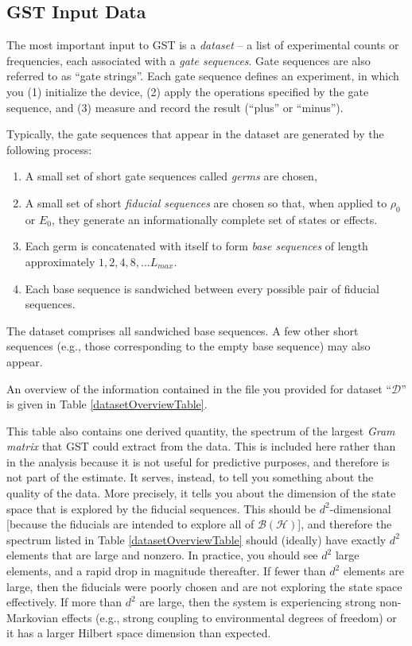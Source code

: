 \documentclass{article}[11pt]
\begin{document}
\subsection{GST Input Data}

The most important input to GST is a \emph{dataset} -- a list of experimental counts or frequencies, each associated with a \emph{gate sequences}.  Gate sequences are also referred to as ``gate strings''.  Each gate sequence defines an experiment, in which you (1) initialize the device, (2) apply the operations specified by the gate sequence, and (3) measure and record the result (``plus'' or ``minus'').

Typically, the gate sequences that appear in the dataset are generated by the following process:
\begin{enumerate}
\item A small set of short gate sequences called \emph{germs} are chosen,
\item A small set of short \emph{fiducial sequences} are chosen so that, when applied to $\rho_0$ or $E_0$, they generate an informationally complete set of states or effects.
\item Each germ is concatenated with itself to form \emph{base sequences} of length approximately $1,2,4,8,\ldots L_{max}$.
\item Each base sequence is sandwiched between every possible pair of fiducial sequences.
\end{enumerate}
The dataset comprises all sandwiched base sequences.  A few other short sequences (e.g., those corresponding to the empty base sequence) may also appear.

\iftoggle{LsAndGermsSet}{ The fiducial sequences and germs for \emph{this} dataset are given in Table \ref{fiducialAndGermListTables}. }{ Fiducial sequence and germ information was not given for this report, and may not be applicable.}  An overview of the information contained in the file you provided for dataset ``$\mathcal{D}$'' is given in Table \ref{datasetOverviewTable}.  

This table also contains one derived quantity, the spectrum of the largest \emph{Gram matrix} that GST could extract from the data.  This is included here rather than in the analysis because it is not useful for predictive purposes, and therefore is not part of the estimate.  It serves, instead, to tell you something about the quality of the data.  More precisely, it tells you about the dimension of the state space that is explored by the fiducial sequences.  This should be $d^2$-dimensional [because the fiducials are intended to explore all of $\mathcal{B}(\mathcal{H})$], and therefore the spectrum listed in Table \ref{datasetOverviewTable} should (ideally) have exactly $d^2$ elements that are large and nonzero.  In practice, you should see $d^2$ large elements, and a rapid drop in magnitude thereafter.  If fewer than $d^2$ elements are large, then the fiducials were poorly chosen and are not exploring the state space effectively.  If more than $d^2$ are large, then the system is experiencing strong non-Markovian effects (e.g., strong coupling to environmental degrees of freedom) or it has a larger Hilbert space dimension than expected.
\end{document}
